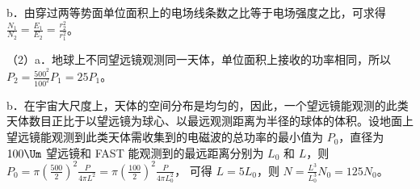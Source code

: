 \documentclass[\gkver]{gaokaozhenti}
\begin{document}
\begin{enumerate}
{b．由穿过两等势面单位面积上的电场线条数之比等于电场强度之比，可求得
$\frac{N_{1}}{N_{2}} = \frac{E_{1}}{E_{2}} = \frac{r_{2}^{2}}{r_{1}^{2}}$。

（2）a．地球上不同望远镜观测同一天体，单位面积上接收的功率相同，所以
$P_{2} = \frac{500^{2}}{100^{2}}P_{1} = 25P_{1}$。

b．在宇宙大尺度上，天体的空间分布是均匀的，因此，一个望远镜能观测的此类天体数目正比于以望远镜为球心、以最远观测距离为半径的球体的体积。设地面上望远镜能观测到此类天体需收集到的电磁波的总功率的最小值为 $P_{0}$，直径为 $100\Um$ 望远镜和 FAST 能观测到的最远距离分别为 $L_{0}$ 和 $L$，则
$P_{0} = \pi\left(\frac{500}{2}\right)^{2}\frac{P}{4\pi L^{2}} = \pi\left(\frac{100}{2}\right)^{2}\frac{P}{4\pi L_{0}^{2}}$，
可得 $L = 5L_{0}$，则
$N = \frac{L^{3}}{L_{0}^{3}}N_{0} = 125N_{0}$。
}

\end{enumerate}
\end{document}
